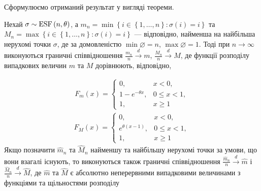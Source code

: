 Сформулюємо отриманий результат у вигляді теореми.
\begin{theorem}
    Нехай $\sigma \sim \mathrm{ESF}\left(n, \theta\right)$, а 
    $m_n = \min\left\{i\in \left\{1,\dots,n\right\}: \sigma(i) = i\right\}$
    та $M_n = \max\left\{i\in \left\{1,\dots,n\right\}: \sigma(i) = i\right\}$ --- відповідно,
    найменша на найбільша нерухомі точки $\sigma$, де за домовленістю
    $\min \varnothing = n$, $\max \varnothing = 1$. Тоді при $n\to\infty$ виконуються граничні
    співвідношення
    $\frac{m_n}{n} \overset{d}{\longrightarrow} m$, $\frac{M_n}{n} \overset{d}{\longrightarrow} M$,
    де функції розподілу випадкових величин $m$ та $M$ дорівнюють, відповідно,

    \begin{gather}
        F_m(x) = \begin{cases}
            0, & x < 0, \\
            1 - e^{-\theta x}, & 0 \leq x < 1, \\
            1, & x \geq 1
        \end{cases}
    \end{gather}
    \begin{gather}
        F_M(x) = \begin{cases}
            0, & x < 0, \\
            e^{\theta(x - 1)}, & 0 \leq x < 1, \\
            1, & x \geq 1
        \end{cases}
    \end{gather}
    Якщо позначити $\widehat{m}_n$ та $\widehat{M}_n$ найменшу та найбільшу нерухомі точки
    за умови, що вони взагалі існують, то виконуються також граничні співвідношення
    $\frac{\widehat{m}_n}{n} \overset{d}{\longrightarrow} \widehat{m}$ і
    $\frac{\widehat{M}_n}{n} \overset{d}{\longrightarrow} \widehat{M}$, де
    $\widehat{m}$ та $\widehat{M}$ є абсолютно неперервними випадковими величинами
    з функціями та щільностями розподілу


\end{theorem}
